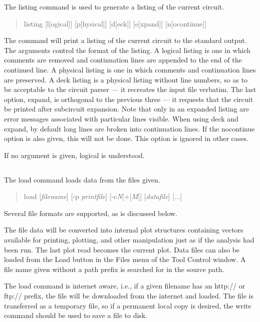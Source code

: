 The {\cb listing} command is used to generate a listing of the current
circuit.
\begin{quote}\vt
listing [l[ogical]] [p[hysical]] [d[eck]] [e[xpand]] [n[ocontinue]]
\end{quote}
The command will print a listing of the current circuit to the
standard output.  The arguments control the format of the listing.  A
{\vt logical} listing is one in which comments are removed and
continuation lines are appended to the end of the continued line.  A
{\vt physical} listing is one in which comments and continuation lines
are preserved.  A {\vt deck} listing is a {\vt physical} listing
without line numbers, so as to be acceptable to the circuit parser ---
it recreates the input file verbatim.  The last option, {\vt expand},
is orthogonal to the previous three --- it requests that the circuit
be printed after subcircuit expansion.  Note that only in an expanded
listing are error messages associated with particular lines visible. 
When using {\vt deck} and {\vt expand}, by default long lines are
broken into continuation lines.  If the {\vt nocontinue} option is
also given, this will not be done.  This option is ignored in other
cases.

If no argument is given, {\vt logical} is understood.

\subsection{}


The {\cb load} command loads data from the files given.
\begin{quote}\vt
load [{\it filename\/}] [{\vt -p} {\it printfile\/}]
 [{\vt -c}{\it N\/}[{\vt +}[{\it M\/}]] [{\it datafile\/}] [...]
\end{quote}

Several file formats are supported, as is discussed below.

The file data will be converted into internal plot structures
containing vectors available for printing, plotting, and other
manipulation just as if the analysis had been run.  The last plot read
becomes the current plot.  Data files can also be loaded from the {\cb
Load} button in the {\cb Files} menu of the {\cb Tool Control} window. 
A file name given without a path prefix is searched for in the source
path.

The {\cb load} command is internet aware, i.e., if a given filename
has an {\vt http://} or {\vt ftp://} prefix, the file will be
downloaded from the internet and loaded.  The file is transferred as a
temporary file, so if a permanent local copy is desired, the {\cb
write} command should be used to save a file to disk.

